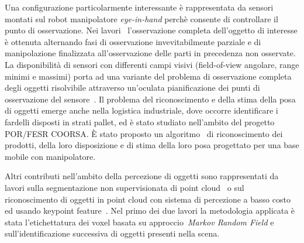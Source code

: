 \documentclass[11pt]{article}
\begin{document}
Una configurazione particolarmente interessante \`e rappresentata da sensori montati sul robot manipolatore 
\emph{eye-in-hand} perch\`e consente di controllare il punto di osservazione. 
Nei lavori~\cite{aleotti2014jirs,aleotti2012icra} l'osservazione completa dell'oggetto di interesse
\`e ottenuta alternando fasi di osservazione invevitabilmente parziale e di manipolazione finalizzata 
all'osservazione delle parti in precedenza non osservate.
La disponibilit\`a di sensori con differenti campi visivi (field-of-view angolare, range minimi e massimi) porta ad una variante del problema di osservazione completa degli oggetti risolvibile attraverso un'oculata pianificazione dei punti di osservazione del sensore~\cite{aleotti2014iros}. 
Il problema del riconoscimento e della stima della posa di oggetti emerge anche nella logistica industriale, dove occorre identificare i fardelli disposti in strati pallet, 
ed \`e stato studiato nell'ambito del progetto POR/FESR COORSA.
\`E stato proposto un algoritmo~\cite{chiaravalli2020etfa} di riconoscimento dei prodotti, della loro disposizione e di stima della loro posa progettato per una base mobile con manipolatore. 

Altri contributi nell'ambito della percezione di oggetti sono rappresentati da lavori sulla segmentazione non supervisionata di point cloud~\cite{lodirizzini2014ias} o sul riconoscimento di oggetti in point cloud con sistema di percezione a basso costo ed usando keypoint feature~\cite{oleari2013iccp}. 
Nel primo dei due lavori la metodologia applicata \`e stata l'etichettatura dei voxel basata su approccio~\emph{Markov Random Field} e sull'identificazione successiva di oggetti presenti nella scena. 

 
\end{document}
